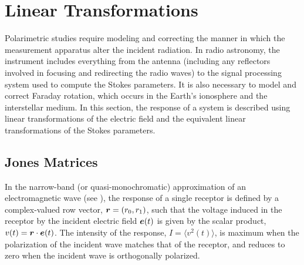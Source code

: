 \section{Linear Transformations}
\label{sec:linear_transformations}

Polarimetric studies require modeling and correcting the manner in which the measurement apparatus alter the incident radiation.
%
In radio astronomy, the instrument includes everything from the antenna (including any reflectors involved in focusing and redirecting the radio waves) to the signal processing system used to compute the Stokes parameters.
%
It is also necessary to model and correct Faraday rotation, which occurs in the Earth's ionosphere and the interstellar medium.
%
In this section, the response of a system is described using linear transformations of the electric field and the equivalent linear transformations of the Stokes parameters.


\subsection{Jones Matrices}

In the narrow-band (or quasi-monochromatic) approximation of an electromagnetic wave (see ), the response of a single receptor 
is defined by a complex-valued row vector, $\mbox{\boldmath $r$} = (r_0, r_1)$, such that the voltage induced in the receptor by the incident electric field $\mbox{\boldmath $e$}(t)$ is given by the scalar product, $v(t)=\mbox{\boldmath $r$} \cdot \mbox{\boldmath $e$}(t)$.
%
The intensity of the response, $I=\langle v^2(t) \rangle$, is maximum when the polarization of the incident wave matches that of the receptor, and reduces to zero when the incident wave is orthogonally polarized.
%

